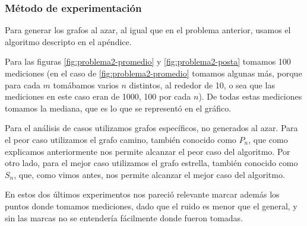 \subsubsection{M\'etodo de experimentación}

Para generar los grafos al azar, al igual que en el problema anterior, usamos el algoritmo descripto en el apéndice.

Para las figuras \ref{fig:problema2-promedio} y \ref{fig:problema2-posta} tomamos 100 mediciones (en el caso de \ref{fig:problema2-promedio} tomamos algunas más, porque para cada $m$ tomábamos varios $n$ distintos, al rededor de 10, o sea que las mediciones en este caso eran de 1000, 100 por cada $n$). De todas estas mediciones tomamos la mediana, que es lo que se representó en el gráfico.

Para el análisis de casos utilizamos grafos específicos, no generados al azar. Para el peor caso utilizamos el grafo camino, también conocido como $P_n$, que como explicamos anteriormente nos permite alcanzar el peor caso del algoritmo.
Por otro lado, para el mejor caso utilizamos el grafo estrella, también conocido como $S_n$, que, como vimos antes, nos permite alcanzar el mejor caso del algoritmo.

En estos dos últimos experimentos nos pareció relevante marcar además los puntos donde tomamos mediciones, dado que el ruido es menor que el general, y sin las marcas no se entendería fácilmente donde fueron tomadas.



